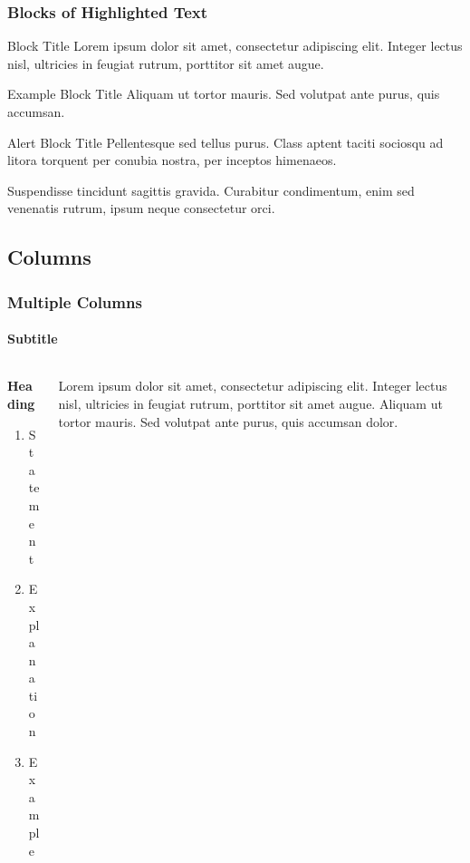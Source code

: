 \documentclass[
11pt, %
]{beamer}
\begin{document}
	\begin{frame}
		\frametitle{Blocks of Highlighted Text}
		
		\begin{block}{Block Title}
			Lorem ipsum dolor sit amet, consectetur adipiscing elit. Integer lectus nisl, ultricies in feugiat rutrum, porttitor sit amet augue.
		\end{block}
		
		\begin{exampleblock}{Example Block Title}
			Aliquam ut tortor mauris. Sed volutpat ante purus, quis accumsan.
		\end{exampleblock}
		
		\begin{alertblock}{Alert Block Title}
			Pellentesque sed tellus purus. Class aptent taciti sociosqu ad litora torquent per conubia nostra, per inceptos himenaeos.
		\end{alertblock}
		
		\begin{block}{} %
			Suspendisse tincidunt sagittis gravida. Curabitur condimentum, enim sed venenatis rutrum, ipsum neque consectetur orci.
		\end{block}
	\end{frame}
	
	
	\subsection{Columns}
	
	\begin{frame}
		\frametitle{Multiple Columns}
		\framesubtitle{Subtitle} %
		
		\begin{columns}[c] %
			\begin{column}{0.45\textwidth} %
				\textbf{Heading}
				\begin{enumerate}
					\item Statement
					\item Explanation
					\item Example
				\end{enumerate}
			\end{column}
			\begin{column}{0.5\textwidth} %
				Lorem ipsum dolor sit amet, consectetur adipiscing elit. Integer lectus nisl, ultricies in feugiat rutrum, porttitor sit amet augue. Aliquam ut tortor mauris. Sed volutpat ante purus, quis accumsan dolor.
			\end{column}
		\end{columns}
	\end{frame}
	
\end{document}
